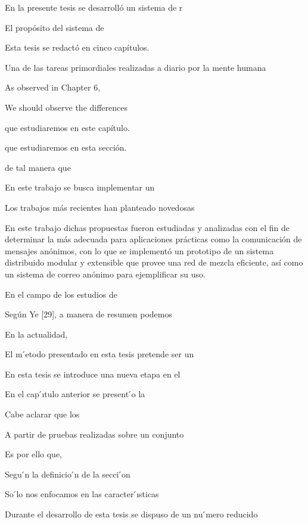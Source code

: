 En la presente tesis se desarrolló un sistema de r

El propósito del sistema de


Esta tesis se redactó en cinco capítulos. 


Una de las tareas primordiales realizadas a diario por la mente humana 



As observed in Chapter 6, 



We should observe the differences




que estudiaremos en este capítulo.


que estudiaremos en esta sección.



de tal manera que 



En este trabajo se busca implementar un 


Los trabajos más recientes han planteado novedosas

 En este trabajo dichas propuestas fueron estudiadas y analizadas con el fin de determinar la más adecuada para aplicaciones prácticas como la comunicación de mensajes anónimos, con lo que se implementó un prototipo de un sistema distribuido modular y extensible que provee una red de mezcla eficiente, así como un sistema de correo anónimo para ejemplificar su uso.



En el campo de los estudios de 



Según Ye [29], a manera de resumen podemos


En la actualidad,

El m ́etodo presentado en esta tesis pretende ser un 


En esta tesis se introduce una nueva etapa en el 



En el cap ́ıtulo anterior se present ́o la


Cabe aclarar que los 


A partir de pruebas realizadas sobre un conjunto 


Es por ello que,

Segu ́n la definicio ́n de la secci ́on


So ́lo nos enfocamos en las caracter ́ısticas

Durante el desarrollo de esta tesis se dispuso de un nu ́mero reducido 



